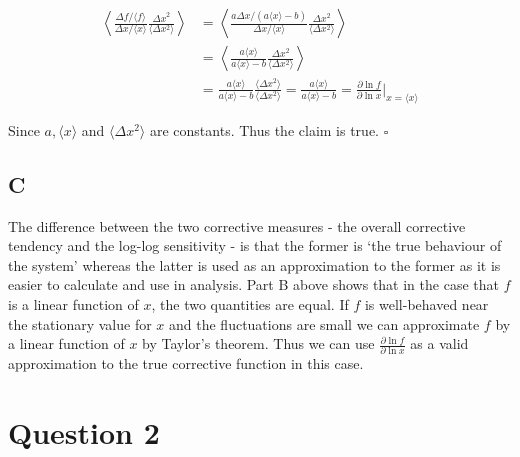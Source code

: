 \documentclass[a4paper,12pt]{article}
\begin{document}
\begin{align*}
\left \langle \frac{\Delta f / \langle f \rangle}{\Delta x / \langle x \rangle} \frac{{\Delta x}^2}{\langle \Delta x^2 \rangle} \right \rangle & = \left \langle \frac{a \Delta x /( a \langle x \rangle - b)}{\Delta x / \langle x \rangle} \frac{\Delta x ^2}{\langle \Delta x ^2 \rangle} \right \rangle \\
&= \left \langle \frac{a \langle x \rangle}{a \langle x \rangle - b} \frac{\Delta x ^2}{\langle \Delta x ^2 \rangle} \right \rangle \\
&= \frac{a \langle x \rangle}{a \langle x \rangle - b} \frac{\langle \Delta x ^2 \rangle}{\langle \Delta x ^2 \rangle} = \frac{a \langle x \rangle}{a \langle x \rangle - b} = \frac{\partial \ln f}{\partial \ln x} \bigg|_{x=\langle x \rangle}
\end{align*}

Since $a, \langle x \rangle$ and $\langle \Delta x^2\rangle$ are constants. Thus the claim is true.  $\square$

\subsection*{C}

The difference between the two corrective measures - the overall corrective tendency and the log-log sensitivity - is that the former is `the true behaviour of the system' whereas the latter is used as an approximation to the former as it is easier to calculate and use in analysis. Part B above shows that in the case that $f$ is a linear function of $x$, the two quantities are equal. If $f$ is well-behaved near the stationary value for $x$ and the fluctuations are small we can approximate $f$ by a linear function of $x$ by Taylor's theorem. Thus we can use $\frac{\partial \ln f}{\partial \ln x}$ as a valid approximation to the true corrective function in this case.


\section*{Question 2}
\end{document}
